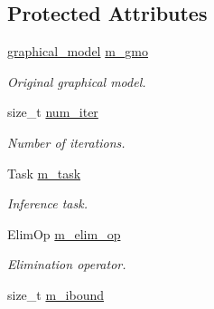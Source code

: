 \subsection*{Protected Attributes}
\begin{DoxyCompactItemize}
\item 
\hypertarget{classmerlin_1_1ijgp_a94a5a3960cccee65a302db50d3157390}{}\hyperlink{classmerlin_1_1graphical__model}{graphical\+\_\+model} \hyperlink{classmerlin_1_1ijgp_a94a5a3960cccee65a302db50d3157390}{m\+\_\+gmo}\label{classmerlin_1_1ijgp_a94a5a3960cccee65a302db50d3157390}

\begin{DoxyCompactList}\small\item\em Original graphical model. \end{DoxyCompactList}\item 
\hypertarget{classmerlin_1_1ijgp_a277f1da495f57da65fad7903dba33e88}{}size\+\_\+t \hyperlink{classmerlin_1_1ijgp_a277f1da495f57da65fad7903dba33e88}{num\+\_\+iter}\label{classmerlin_1_1ijgp_a277f1da495f57da65fad7903dba33e88}

\begin{DoxyCompactList}\small\item\em Number of iterations. \end{DoxyCompactList}\item 
\hypertarget{classmerlin_1_1ijgp_a95e03dea51e4dc87d7a48a50415df005}{}Task \hyperlink{classmerlin_1_1ijgp_a95e03dea51e4dc87d7a48a50415df005}{m\+\_\+task}\label{classmerlin_1_1ijgp_a95e03dea51e4dc87d7a48a50415df005}

\begin{DoxyCompactList}\small\item\em Inference task. \end{DoxyCompactList}\item 
\hypertarget{classmerlin_1_1ijgp_a4a80b800e11190f3eb790cfd9899dad7}{}Elim\+Op \hyperlink{classmerlin_1_1ijgp_a4a80b800e11190f3eb790cfd9899dad7}{m\+\_\+elim\+\_\+op}\label{classmerlin_1_1ijgp_a4a80b800e11190f3eb790cfd9899dad7}

\begin{DoxyCompactList}\small\item\em Elimination operator. \end{DoxyCompactList}\item 
\hypertarget{classmerlin_1_1ijgp_aa15a0be92dea2367ba5686b3f9aebebe}{}size\+\_\+t \hyperlink{classmerlin_1_1ijgp_aa15a0be92dea2367ba5686b3f9aebebe}{m\+\_\+ibound}\label{classmerlin_1_1ijgp_aa15a0be92dea2367ba5686b3f9aebebe}


\end{DoxyCompactItemize}
